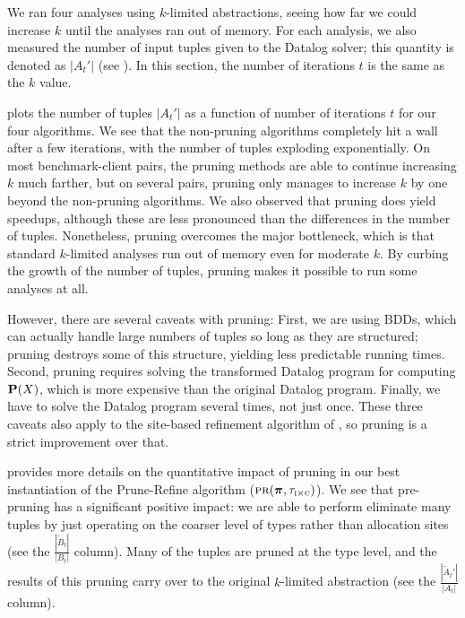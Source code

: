 
We ran four analyses using $k$-limited abstractions, seeing
how far we could increase $k$ until the analyses ran out of memory.
For each analysis, we also measured the number of input tuples given to
the Datalog solver; this quantity is denoted as $|A_t'|$ (see
).  In this section, the number of iterations $t$ is the same as the $k$ value.

 plots the number of tuples $|A_t'|$ as a function of
number of iterations $t$ for our four algorithms.  We see that the
non-pruning algorithms completely hit a wall after a few iterations, with the
number of tuples exploding exponentially.  On most benchmark-client pairs, the
pruning methods are able to continue increasing $k$ much farther, but on several
pairs, pruning only manages to increase $k$ by one beyond the non-pruning algorithms.
We also observed that pruning does yield speedups, although these are
less pronounced than the differences in the number of tuples.  Nonetheless, pruning
overcomes the major bottleneck, which is that standard $k$-limited analyses run
out of memory even for moderate $k$.  By curbing the growth of the
number of tuples, pruning makes it possible to run some analyses at all.

However, there are several caveats with pruning:
First, we are using BDDs, which can actually handle large numbers of tuples
so long as they are structured; pruning destroys some of this structure,
yielding less predictable running times.  Second, pruning requires solving
the transformed Datalog program for computing $\mathbf{P}(X)$, which is more expensive than the original Datalog program.
Finally, we have to solve the Datalog program several times, not just once.
These three caveats also apply to the site-based refinement algorithm of \cite{liang11minimal},
so pruning is a strict improvement over that.


 provides more details on the quantitative impact of pruning in our
best instantiation of the Prune-Refine algorithm ($\text{\sc pr}(\mbox{\boldmath$\pi$}, \tau_{\text{\sc i} \times \text{\sc c}})$).  We see that pre-pruning has a
significant positive impact: we are able to perform eliminate many tuples by just operating on the coarser
level of types rather than allocation sites (see the $\frac{|\tilde B_t|}{|B_t|}$ column).  Many of the tuples are pruned
at the type level, and the results of this pruning carry over to the original
$k$-limited abstraction (see the $\frac{|\tilde A_t'|}{|A_t|}$ column).

